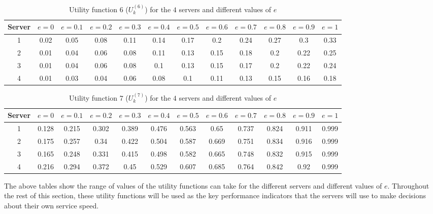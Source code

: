 \begin{table}[H]
    \caption{Utility function \(6\) (\(U_k^{(6)}\)) for the \(4\) servers and
    different values of \(e\)}
    \label{tab:case_study_utility_6_all_servers}
    \begin{adjustbox}{width=\columnwidth,center}
        \begin{tabular}{|c|c|c|c|c|c|c|c|c|c|c|c|}
            \hline
            Server & \(e = 0\) & \(e = 0.1\) & \(e = 0.2\) & \(e = 0.3\)
                   & \(e = 0.4\) & \(e = 0.5\) & \(e = 0.6\) & \(e = 0.7\)
                   & \(e = 0.8\) & \(e = 0.9\) & \(e = 1\) \\
            \hline
            1 & 0.02 & 0.05 & 0.08 & 0.11 & 0.14 & 0.17 & 0.2 & 0.24
            & 0.27 & 0.3 & 0.33 \\ 
            2 & 0.01 & 0.04 & 0.06 & 0.08 & 0.11 & 0.13 & 0.15 & 0.18
            & 0.2 & 0.22 & 0.25 \\ 
            3 & 0.01 & 0.04 & 0.06 & 0.08 & 0.1 & 0.13 & 0.15 & 0.17
            & 0.2 & 0.22 & 0.24 \\ 
            4 & 0.01 & 0.03 & 0.04 & 0.06 & 0.08 & 0.1 & 0.11 & 0.13
            & 0.15 & 0.16 & 0.18 \\ 
            \hline
        \end{tabular}
    \end{adjustbox}
\end{table}

\begin{table}[H]
    \caption{Utility function \(7\) (\(U_k^{(7)}\)) for the \(4\) servers and
    different values of \(e\)}
    \label{tab:case_study_utility_7_all_servers}
    \begin{adjustbox}{width=\columnwidth,center}
        \begin{tabular}{|c|c|c|c|c|c|c|c|c|c|c|c|}
            \hline
            Server & \(e = 0\) & \(e = 0.1\) & \(e = 0.2\) & \(e = 0.3\)
                   & \(e = 0.4\) & \(e = 0.5\) & \(e = 0.6\) & \(e = 0.7\)
                   & \(e = 0.8\) & \(e = 0.9\) & \(e = 1\) \\
            \hline
            1 & 0.128 & 0.215 & 0.302 & 0.389 & 0.476 & 0.563 & 0.65 & 0.737
            & 0.824 & 0.911 & 0.999 \\ 
            2 & 0.175 & 0.257 & 0.34 & 0.422 & 0.504 & 0.587 & 0.669 & 0.751
            & 0.834 & 0.916 & 0.999 \\ 
            3 & 0.165 & 0.248 & 0.331 & 0.415 & 0.498 & 0.582 & 0.665 & 0.748
            & 0.832 & 0.915 & 0.999 \\ 
            4 & 0.216 & 0.294 & 0.372 & 0.45 & 0.529 & 0.607 & 0.685 & 0.764
            & 0.842 & 0.92 & 0.999 \\ 
            \hline
        \end{tabular}
    \end{adjustbox}
\end{table}

The above tables show the range of values of the utility functions can take
for the different servers and different values of \(e\).
Throughout the rest of this section, these utility functions will be used
as the key performance indicators that the servers will use to make decisions
about their own service speed.
